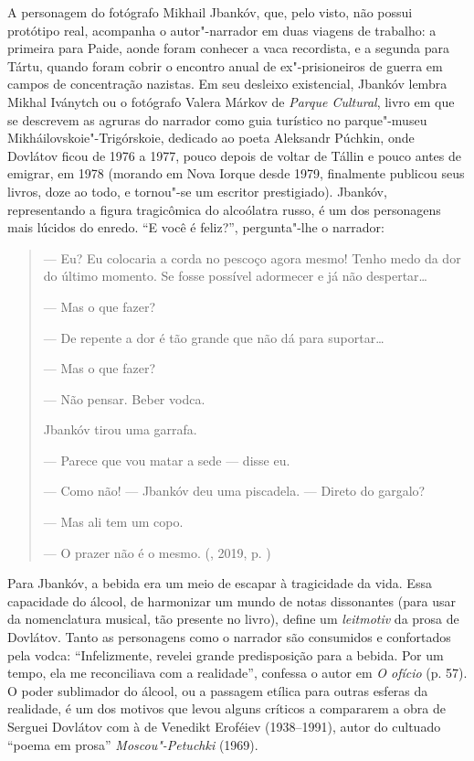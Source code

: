 A personagem do fotógrafo Mikhail Jbankóv, que, pelo visto, não possui
protótipo real, acompanha o autor"-narrador em duas viagens de trabalho:
a primeira para Paide, aonde foram conhecer a vaca recordista, e a
segunda para Tártu, quando foram cobrir o encontro anual de
ex"-prisioneiros de guerra em campos de concentração nazistas. Em seu
desleixo existencial, Jbankóv lembra Mikhal Iványtch ou o fotógrafo
Valera Márkov de \emph{Parque Cultural}, livro em que se descrevem as
agruras do narrador como guia turístico no parque"-museu
Mikháilovskoie"-Trigórskoie, dedicado ao poeta Aleksandr Púchkin, onde
Dovlátov ficou de 1976 a 1977, pouco depois de voltar de Tállin e pouco
antes de emigrar, em 1978 (morando em Nova Iorque desde 1979, finalmente
publicou seus livros, doze ao todo, e tornou"-se um escritor
prestigiado). Jbankóv, representando a figura tragicômica do alcoólatra
russo, é um dos personagens mais lúcidos do enredo. ``E você é feliz?'',
pergunta"-lhe o narrador:

\begin{quotation}
--- Eu? Eu colocaria a corda no pescoço agora mesmo! Tenho medo da dor
do último momento. Se fosse possível adormecer e já não despertar\ldots{}

--- Mas o que fazer?

--- De repente a dor é tão grande que não dá para suportar\ldots{}

--- Mas o que fazer?

--- Não pensar. Beber vodca.

Jbankóv tirou uma garrafa.

--- Parece que vou matar a sede --- disse eu.

--- Como não! --- Jbankóv deu uma piscadela. --- Direto do gargalo?

--- Mas ali tem um copo.

--- O prazer não é o mesmo.
{}(, 2019, p. \pageref{ref01})
\end{quotation}

Para Jbankóv, a bebida era um meio de escapar à tragicidade da vida.
Essa capacidade do álcool, de harmonizar um mundo de notas dissonantes
(para usar da nomenclatura musical, tão presente no livro), define um
\emph{leitmotiv} da prosa de Dovlátov. Tanto as personagens como o
narrador são consumidos e confortados pela vodca: ``Infelizmente,
revelei grande predisposição para a bebida. Por um tempo, ela me
reconciliava com a realidade'', confessa o autor em \emph{O ofício} (p.
57). O poder sublimador do álcool, ou a passagem etílica para outras
esferas da realidade, é um dos motivos que levou alguns críticos a
compararem a obra de Serguei Dovlátov com à de Venedikt Eroféiev
(1938--1991), autor do cultuado ``poema em prosa''
\emph{Moscou"-Petuchki} (1969).

